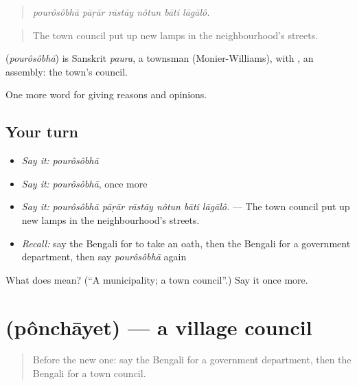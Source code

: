 \begin{quote}
\emph{pourôsôbhā pāṛār rāstāy nôtun bāti lāgālô.}
\end{quote}

\begin{quote}
The town council put up new lamps in the neighbourhood's streets.
\end{quote}

\begin{cousinweb}
\textbf{} (\emph{pourôsôbhā}) is Sanskrit \emph{paura}, a townsman (Monier-Williams), with , an assembly: the town's council.
\end{cousinweb}

\begin{grammarlens}[title={What you've built}]
One more word for giving reasons and opinions.
\end{grammarlens}

\subsection*{Your turn}
\begin{itemize}
\raggedright
  \item \emph{Say it:} \emph{pourôsôbhā}
  \item \emph{Say it:} \emph{pourôsôbhā}, once more
  \item \emph{Say it:} \emph{pourôsôbhā pāṛār rāstāy nôtun bāti lāgālô.} — The town council put up new lamps in the neighbourhood's streets.
  \item \emph{Recall:} say the Bengali for to take an oath, then the Bengali for a government department, then say \emph{pourôsôbhā} again
\end{itemize}

\begin{tcolorbox}[breakable,colback=teal!4,colframe=teal!35!black,title={Before you move on}]
What does  mean? (\textquotedblleft{}A municipality; a town council\textquotedblright{}.) Say it once more.
\end{tcolorbox}
\section[\texorpdfstring{\bn{পঞ্চায়েত} (pônchāyet)}{পঞ্চায়েত (pônchāyet)}]{ (pônchāyet) — a village council}

\label{lesson:BN-C347-ponchayet}



\begin{quote}
Before the new one: say the Bengali for a government department, then the Bengali for a town council.
\end{quote}

